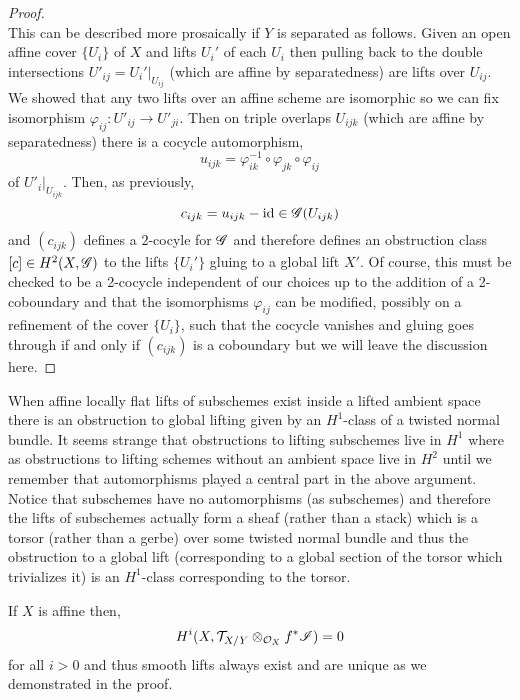 \documentclass[12pt]{article}
\begin{document}
\begin{proof}
\bigskip\\
This can be described more prosaically if $Y$ is separated as follows. Given an open affine cover $\{ U_i \}$ of $X$ and lifts $U_i'$ of each $U_i$ then pulling back to the double intersections $U'_{ij} = U_{i}'|_{U_{ij}}$ (which are affine by separatedness) are lifts over $U_{ij}$. We showed that any two lifts over an affine scheme are isomorphic so we can fix isomorphism $\varphi_{ij} : U'_{ij} \to U'_{ji}$. Then on triple overlaps $U_{ijk}$ (which are affine by separatedness) there is a cocycle automorphism,
\[ u_{ijk} = \varphi_{ik}^{-1} \circ \varphi_{jk} \circ \varphi_{ij} \]
of $U'_i|_{U_{ijk}}$. Then, as previously,
\[ c_{ijk} = u_{ijk} - \mathrm{id} \in \mathscr{G}(U_{ijk}) \]
and $(c_{ijk})$ defines a $2$-cocyle for $\mathscr{G}$ and therefore defines an obstruction class $[c] \in H^2(X, \mathscr{G})$ to the lifts $\{ U_i' \}$ gluing to a global lift $X'$. Of course, this must be checked to be a 2-cocycle independent of our choices up to the addition of a 2-coboundary and that the isomorphisms $\varphi_{ij}$ can be modified, possibly on a refinement of the cover $\{ U_i \}$, such that the cocycle vanishes and gluing goes through if and only if $(c_{ijk})$ is a coboundary but we will leave the discussion here.
\end{proof}

\begin{rmk}
When affine locally flat lifts of subschemes exist inside a lifted ambient space there is an obstruction to global lifting given by an $H^1$-class of a twisted normal bundle. It seems strange that obstructions to lifting subschemes live in $H^1$ where as obstructions to lifting schemes without an ambient space live in $H^2$ until we remember that automorphisms played a central part in the above argument. Notice that subschemes have no automorphisms (as subschemes) and therefore the lifts of subschemes actually form a sheaf (rather than a stack) which is a torsor (rather than a gerbe) over some twisted normal bundle and thus the obstruction to a global lift (corresponding to a global section of the torsor which trivializes it) is an $H^1$-class corresponding to the torsor.
\end{rmk}


\begin{example}
If $X$ is affine then,
\[ H^i(X, \mathcal{T}_{X/Y} \otimes_{\mathcal{O}_{X}} f^* \mathscr{I}) = 0 \]
for all $i > 0$ and thus smooth lifts always exist and are unique as we demonstrated in the proof.
\end{example}
\end{document}
